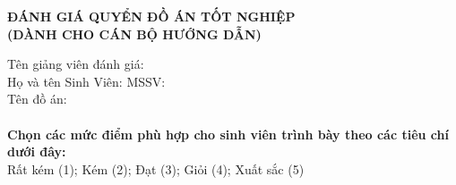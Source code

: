 
\newpage \pagestyle{empty}

\begin{center}
    \textbf{\fontsize{14pt}{0pt}\selectfont ĐÁNH GIÁ QUYỂN ĐỒ ÁN TỐT NGHIỆP}\\
    \vspace{4pt}
    \textbf{\fontsize{13pt}{0pt}\selectfont (DÀNH CHO CÁN BỘ HƯỚNG DẪN) }
\end{center}
\vspace{14pt}
\fontsize{13pt}{20pt}\selectfont Tên giảng viên đánh giá:\\
\fontsize{13pt}{20pt}\selectfont Họ và tên Sinh Viên:
\hspace{5.5cm}
\fontsize{13pt}{20pt}\selectfont MSSV:\\
\fontsize{13pt}{20pt}\selectfont Tên đồ án:\\
\fontsize{13pt}{20pt}\selectfont \\
\textbf{\fontsize{13pt}{20pt}\selectfont Chọn các mức điểm phù hợp cho sinh viên trình bày theo các tiêu chí dưới đây:}\\
\fontsize{13pt}{20pt}\selectfont Rất kém (1); Kém (2); Đạt (3); Giỏi (4); Xuất sắc (5)
